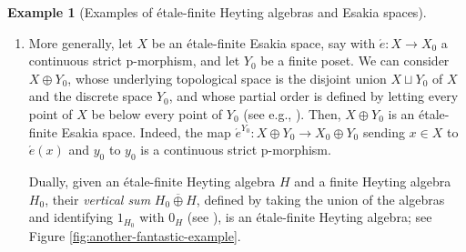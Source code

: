 \documentclass[12pt]{amsart}
\theoremstyle{plain}
\theoremstyle{definition}
\newtheorem{example}[theorem]{Example}
\newcommand{\N}{\mathbb{N}}
\newcommand{\fincofnaturals}{\mathcal{P}_{\mathrm{fin,cof}}(\N)}
\begin{document}
\begin{example}[Examples of étale-finite Heyting algebras and Esakia spaces]
\begin{enumerate}
\begin{figure}[htbp]
            \qquad
            \caption{The space $(\alpha \N)^{\top}$ and its dual Heyting algebra.}
            \label{fig:a-fantastic-example}
        \end{figure}
        
        Let $\mathbf{2}=0<1$ be the two-element chain with the discrete topology. Consider the map $\acute{e}\colon (\alpha\N)^{\top}\to \mathbf{2}$ that sends $\top$ to $1$ and every other point to $0$. Then $\acute{e}$ is a continuous strict p-morphism. Therefore, $(\alpha \N)^\top$ is an \emph{étale-finite Esakia space}.
        
        \item More generally, let $X$ be an étale-finite Esakia space, say with $\acute{e}\colon X\to X_{0}$ a continuous strict p-morphism, and let $Y_{0}$ be a finite poset.
        We can consider $X\oplus Y_{0}$, whose underlying topological space is the disjoint union $X\sqcup Y_{0}$ of $X$ and the discrete space $Y_0$, and whose partial order is defined by letting every point of $X$ be below every point of $Y_{0}$ (see e.g., \cite[Def.~4.1.12]{bezhanishviliphdthesis}).
        Then, $X\oplus Y_{0}$ is an étale-finite Esakia space. Indeed, the map $\acute{e}^{Y_{0}}\colon X\oplus Y_{0}\to X_{0}\oplus Y_{0}$ sending $x\in X$ to $\acute{e}(x)$ and $y_{0}$ to $y_{0}$ is a continuous strict p-morphism.
        
        Dually, given an étale-finite Heyting algebra $H$ and a finite Heyting algebra $H_{0}$, their \emph{vertical sum} $H_{0}\mathbin{\overline{\oplus}} H$, defined by taking the union of the algebras and identifying $1_{H_0}$ with $0_H$ (see \cite[Def.~4.1.13]{bezhanishviliphdthesis}), is an étale-finite Heyting algebra; see Figure \ref{fig:another-fantastic-example}.
        \begin{figure}[h]
            \centering
        

\end{figure}
\end{enumerate}
\end{example}
\end{document}
